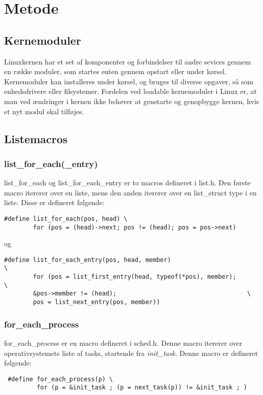 \section{Metode}
\subsection{Kernemoduler}
Linuxkernen har et set af komponenter og forbindelser til andre sevices gennem en række moduler, som startes enten gennem opstart eller under kørsel. Kernemoduler kan installeres under kørsel, og bruges til diverse opgaver, så som enhedsdrivere eller filsystemer. Fordelen ved loadable kernemoduler i Linux er, at man ved ændringer i kernen ikke behøver at genstarte og genopbygge kernen, hvis et nyt modul skal tilføjes.
\subsection{Listemacros}
\subsubsection{list\_for\_each(\_entry)}
list\_for\_each og list\_for\_each\_entry er to macros defineret i list.h. Den første macro itererer over en liste, mens den anden itererer over en list\_struct type i en liste.
Disse er defineret følgende:\\
\begin{lstlisting}
#define list_for_each(pos, head) \
        for (pos = (head)->next; pos != (head); pos = pos->next)
\end{lstlisting}

og
\\
\begin{lstlisting}
#define list_for_each_entry(pos, head, member)                          \
        for (pos = list_first_entry(head, typeof(*pos), member);        \
        &pos->member != (head);                                    \
        pos = list_next_entry(pos, member))
\end{lstlisting}
\subsubsection{for\_each\_process}
for\_each\_process er en macro defineret i sched.h. Denne macro itererer over operativsystemets liste af tasks, startende fra \textit{init\_task}. Denne macro er defineret følgende:\\
\begin{lstlisting}
 #define for_each_process(p) \
         for (p = &init_task ; (p = next_task(p)) != &init_task ; )
\end{lstlisting}
